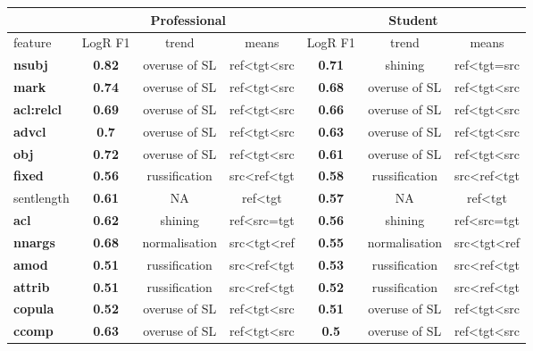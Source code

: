 \begin{longtable}[H]{p{1.6cm}|ccc||ccc}
	\toprule
		      &      \multicolumn{3}{c}{Professional} 	&      \multicolumn{3}{c}{Student}\\
	\midrule
	feature & LogR F1 & trend & means   & LogR F1 & trend   & means   \\
	\midrule
	\textbf{nsubj}   & \textbf{0.82} & overuse of SL  & ref\textless{}tgt\textless{}src & \textbf{0.71} & shining & ref\textless{}tgt=src  \\
	\textbf{mark} & \textbf{0.74} & overuse of SL  & ref\textless{}tgt\textless{}src & \textbf{0.68} & overuse of SL & ref\textless{}tgt\textless{}src \\
	\textbf{acl:relcl}  & \textbf{0.69} & overuse of SL  & ref\textless{}tgt\textless{}src & \textbf{0.66} & overuse of SL & ref\textless{}tgt\textless{}src \\
	\textbf{advcl}   & \textbf{0.7}  & overuse of SL  & ref\textless{}tgt\textless{}src & \textbf{0.63} & overuse of SL & ref\textless{}tgt\textless{}src \\
	\textbf{obj}  & \textbf{0.72} & overuse of SL  & ref\textless{}tgt\textless{}src & \textbf{0.61} & overuse of SL & ref\textless{}tgt\textless{}src \\
	\textbf{fixed}   & \textbf{0.56} & russification  & src\textless{}ref\textless{}tgt & \textbf{0.58} & russification & src\textless{}ref\textless{}tgt \\
	sentlength & \textbf{0.61} & NA  & ref\textless{}tgt & \textbf{0.57} & NA & ref\textless{}tgt \\
	\textbf{acl}  & \textbf{0.62} & shining  & ref\textless{}src=tgt  & \textbf{0.56} & shining & ref\textless{}src=tgt  \\
	\textbf{nnargs}  & \textbf{0.68} & normalisation  & src\textless{}tgt\textless{}ref & \textbf{0.55} & normalisation & src\textless{}tgt\textless{}ref \\
	\textbf{amod} & \textbf{0.51} & russification  & src\textless{}ref\textless{}tgt & \textbf{0.53} & russification & src\textless{}ref\textless{}tgt \\
	\textbf{attrib}  & \textbf{0.51} & russification  & src\textless{}ref\textless{}tgt & \textbf{0.52} & russification & src\textless{}ref\textless{}tgt \\
	\textbf{copula}  & \textbf{0.52} & overuse of SL  & ref\textless{}tgt\textless{}src & \textbf{0.51} & overuse of SL & ref\textless{}tgt\textless{}src \\
	\textbf{ccomp}   & \textbf{0.63} & overuse of SL  & ref\textless{}tgt\textless{}src & \textbf{0.5}  & overuse of SL & ref\textless{}tgt\textless{}src \\

\end{longtable}
